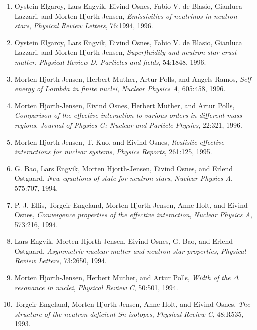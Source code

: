 \documentclass[a4wide,10pt]{article}
\begin{document}
\begin{enumerate}
\item Oystein Elgaroy, Lars Engvik, Eivind Osnes, Fabio V. de Blasio, Gianluca Lazzari, and Morten Hjorth-Jensen, \emph{Emissivities of neutrinos in neutron stars},  \emph{Physical Review Letters}, 76:1994, 1996. 

\item Oystein Elgaroy, Lars Engvik, Eivind Osnes, Fabio V. de Blasio, Gianluca   Lazzari, and Morten Hjorth-Jensen, \emph{Superfluidity and neutron star crust matter},  \emph{Physical Review D. Particles and fields}, 54:1848, 1996. 

\item Morten Hjorth-Jensen, Herbert Muther, Artur Polls, and Angels Ramos, \emph{Self-energy of $Lambda$ in finite nuclei},  \emph{Nuclear Physics A}, 605:458, 1996. 

\item Morten Hjorth-Jensen, Eivind Osnes, Herbert Muther, and Artur Polls, \emph{Comparison of the effective interaction to various orders in   different mass regions}, \emph{Journal of Physics G: Nuclear and Particle Physics}, 22:321,   1996. 

\item Morten Hjorth-Jensen, T. Kuo, and Eivind Osnes, \emph{Realistic effective interactions for nuclear systems},  \emph{Physics Reports}, 261:125, 1995. 

\item G. Bao, Lars Engvik, Morten Hjorth-Jensen, Eivind Osnes, and Erlend Ostgaard, \emph{New equations of state for neutron stars},  \emph{Nuclear Physics A}, 575:707, 1994. 

\item P. J. Ellis, Torgeir Engeland, Morten Hjorth-Jensen, Anne Holt, and Eivind   Osnes, \emph{Convergence properties of the effective interaction},  \emph{Nuclear Physics A}, 573:216, 1994. 

\item Lars Engvik, Morten Hjorth-Jensen, Eivind Osnes, G. Bao, and Erlend Ostgaard, \emph{Asymmetric nuclear matter and neutron star properties},  \emph{Physical Review Letters}, 73:2650, 1994. 

\item Morten Hjorth-Jensen, Herbert Muther, and Artur Polls, \emph{Width of the $\Delta$ resonance in nuclei},  \emph{Physical Review C}, 50:501, 1994. 

\item Torgeir Engeland, Morten Hjorth-Jensen, Anne Holt, and Eivind Osnes, \emph{The structure of the neutron deficient Sn isotopes},  \emph{Physical Review C}, 48:R535, 1993. 


\end{enumerate}
\end{document}
